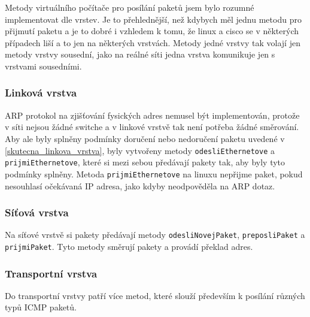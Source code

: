 Metody virtuálního počítače pro posílání paketů jsem bylo rozumné implementovat dle vrstev. Je to přehlednější, než kdybych měl jednu metodu pro přijmutí paketu a je to dobré i vzhledem k tomu, že linux a cisco se v některých případech liší a to jen na některých vrstvách. Metody jedné vrstvy tak volají jen metody vrstvy sousední, jako na reálné síti jedna vrstva komunikuje jen s vrstvami sousedními.

\subsubsection{Linková vrstva}

ARP protokol na zjišťování fysických adres nemusel být implementován, protože v síti nejsou žádné switche a v linkové vrstvě tak není potřeba žádné směrování. Aby ale byly splněny podmínky doručení nebo nedoručení paketu uvedené v \ref{skutecna_linkova_vrstva}, byly vytvořeny metody \verb|odesliEthernetove| a \verb|prijmiEthernetove|, které si mezi sebou předávají pakety tak, aby byly tyto podmínky splněny. Metoda \verb|prijmiEthernetove| na linuxu nepřijme paket, pokud nesouhlasí očekávaná IP adresa, jako kdyby neodpověděla na ARP dotaz.

\subsubsection{Síťová vrstva}

Na síťové vrstvě si pakety předávají metody \verb|odesliNovejPaket|, \verb|preposliPaket| a \verb|prijmiPaket|. Tyto metody směrují pakety a provádí překlad adres.

\subsubsection{Transportní vrstva}

Do transportní vrstvy patří více metod, které slouží především k posílání různých typů ICMP paketů.
  
  
